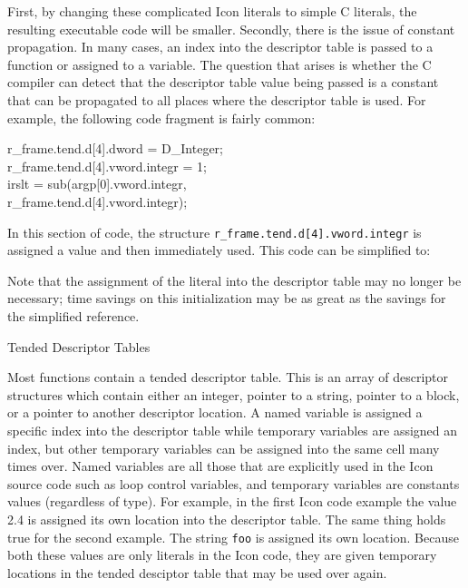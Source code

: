 First, by changing these complicated Icon literals to simple C
literals, the resulting executable code will be smaller. Secondly,
there is the issue of constant propagation. In many cases, an index
into the descriptor table is passed to a function or assigned to a
variable. The question that arises is whether the C compiler can
detect that the descriptor table value being passed is a constant that
can be propagated to all places where the descriptor table is used.
For example, the following code fragment is fairly common:

\begin{iconcode}
\>   r\_frame.tend.d[4].dword = D\_Integer;\\
\>   r\_frame.tend.d[4].vword.integr = 1;\\
\>   irslt = sub(argp[0].vword.integr, \\
\> \> \> \> \> r\_frame.tend.d[4].vword.integr);
\end{iconcode}

In this section of code, the structure
\texttt{r\_frame.tend.d[4].vword.integr} is assigned a value and then
immediately used. This code can be simplified to:



Note that the assignment of the literal into the descriptor table may
no longer be necessary; time savings on this initialization may be as
great as the savings for the simplified reference.

{\sffamily
Tended Descriptor Tables}


Most functions contain a tended descriptor table. This is an array of
descriptor structures which contain either an integer, pointer to a
string, pointer to a block, or a pointer to another descriptor
location. A named variable is assigned a specific index into the
descriptor table while temporary variables are assigned an index, but
other temporary variables can be assigned into the same cell many
times over. Named variables are all those that are explicitly used in
the Icon source code such as loop control variables, and temporary
variables are constants values (regardless of type). For example, in
the first Icon code example the value 2.4 is assigned its own location
into the descriptor table. The same thing holds true for the second
example. The string \texttt{{\textquotedbl}foo{\textquotedbl}} is
assigned its own location. Because both these values are only literals
in the Icon code, they are given temporary locations in the tended
desciptor table that may be used over again.

